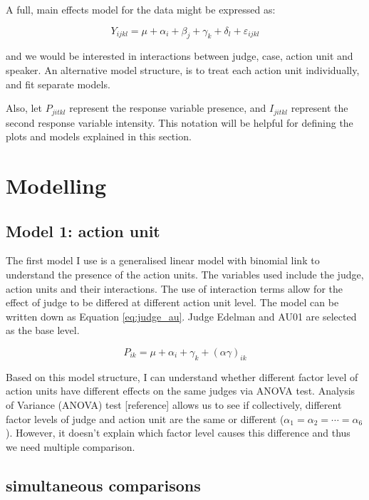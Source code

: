 \documentclass{monashthesis}
\begin{document}
A full, main effects model for the data might be expressed as:

\[Y_{ijkl} = \mu + \alpha_i + \beta_j + \gamma_k + \delta_l + \varepsilon_{ijkl}\]

\noindent and we would be interested in interactions between judge, case, action unit and speaker. An alternative model structure, is to treat each action unit individually, and fit separate models.

Also, let \(P_{jitkl}\) represent the response variable presence, and \(I_{jitkl}\) represent the second response variable intensity. This notation will be helpful for defining the plots and models explained in this section.

\hypertarget{modelling}{%
\section{Modelling}\label{modelling}}

\hypertarget{model-1-action-unit}{%
\subsection{Model 1: action unit}\label{model-1-action-unit}}

The first model I use is a generalised linear model with binomial link to understand the presence of the action units. The variables used include the judge, action units and their interactions. The use of interaction terms allow for the effect of judge to be differed at different action unit level. The model can be written down as Equation \ref{eq:judge_au}. Judge Edelman and AU01 are selected as the base level.

\begin{equation}\label{eq:judge_au}
P_{ik} = \mu + \alpha_i + \gamma_k + (\alpha\gamma)_{ik}
\end{equation}

Based on this model structure, I can understand whether different factor level of action units have different effects on the same judges via ANOVA test. Analysis of Variance (ANOVA) test {[}reference{]} allows us to see if collectively, different factor levels of judge and action unit are the same or different (\(\alpha_1 = \alpha_2 = \cdots = \alpha_6\)). However, it doesn't explain which factor level causes this difference and thus we need multiple comparison.

\hypertarget{simultaneous-comparisons}{%
\subsection{simultaneous comparisons}\label{simultaneous-comparisons}}
\end{document}
